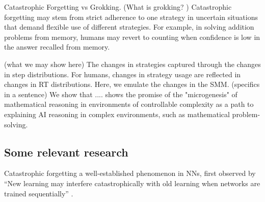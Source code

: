 \documentclass{article}
\begin{document}
Catastrophic Forgetting vs Grokking. (What is grokking? \citet{nanda2023progress}) Catastrophic forgetting may stem from strict adherence to one strategy in uncertain situations that demand flexible use of different strategies. For example, in solving addition problems from memory, humans may revert to counting when confidence is low in the answer recalled from memory.

(what we may show here) The changes in strategies captured through the changes in step distributions. For humans, changes in strategy usage are reflected in changes in RT distributions. Here, we emulate the changes in the SMM. (specifics in a sentence) We show that .... shows the promise of the "microgenesis" of mathematical reasoning in environments of controllable complexity as a path to explaining AI reasoning in complex environments, such as mathematical problem-solving.

\subsection*{Some relevant research}
Catastrophic forgetting a well-established phenomenon in NNs, first observed by \citet{mccloskey1989catastrophic}
``New learning may interfere catastrophically with old learning when networks are trained sequentially'' \citep[][pp. 109]{mccloskey1989catastrophic}.



\end{document}
